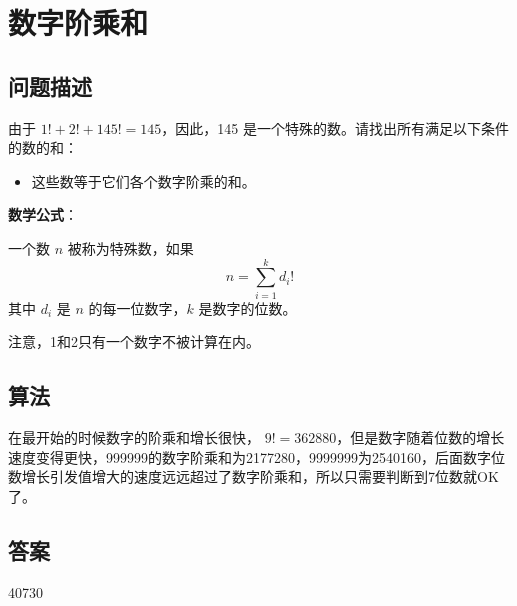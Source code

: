 \section{数字阶乘和}\label{sec:problem34}
\subsection{问题描述}
\begin{tcolorbox}

	由于 $1! + 2! + 145! = 145$，因此，145 是一个特殊的数。请找出所有满足以下条件的数的和：
	\begin{itemize}
		\item 这些数等于它们各个数字阶乘的和。
	\end{itemize}

	\textbf{数学公式}：

	一个数 $n$ 被称为特殊数，如果
	\[
		n = \sum_{i=1}^{k} d_i!
	\]
	其中 $d_i$ 是 $n$ 的每一位数字，$k$ 是数字的位数。

    注意，1和2只有一个数字不被计算在内。
\end{tcolorbox}

\subsection{算法}
在最开始的时候数字的阶乘和增长很快， \( 9! = 362880
\)，但是数字随着位数的增长速度变得更快，\num{999999}的数字阶乘和为\num{2177280}，\num{9999999}为\num{2540160}，后面数字位数增长引发值增大的速度远远超过了数字阶乘和，所以只需要判断到7位数就OK了。

\subsection{答案}
40730
